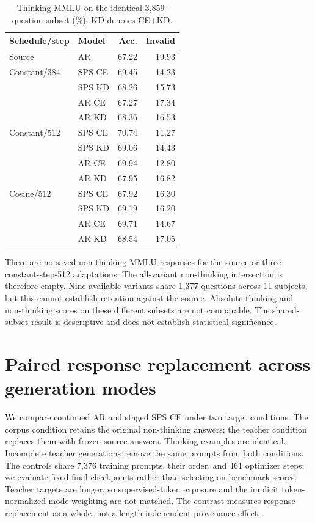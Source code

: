\begin{table}[h]
\centering\small
\begin{tabular}{llrr}
\toprule
Schedule/step & Model & Acc. & Invalid\\
\midrule
Source & AR & 67.22 & 19.93\\
Constant/384 & SPS CE & 69.45 & 14.23\\
 & SPS KD & 68.26 & 15.73\\
 & AR CE & 67.27 & 17.34\\
 & AR KD & 68.36 & 16.53\\
Constant/512 & SPS CE & 70.74 & 11.27\\
 & SPS KD & 69.06 & 14.43\\
 & AR CE & 69.94 & 12.80\\
 & AR KD & 67.95 & 16.82\\
Cosine/512 & SPS CE & 67.92 & 16.30\\
 & SPS KD & 69.19 & 16.20\\
 & AR CE & 69.71 & 14.67\\
 & AR KD & 68.54 & 17.05\\
\bottomrule
\end{tabular}
\caption{Thinking MMLU on the identical 3,859-question subset (\%). KD denotes CE+KD.}
\end{table}

There are no saved non-thinking MMLU responses for the source or three constant-step-512 adaptations. The all-variant non-thinking intersection is therefore empty. Nine available variants share 1,377 questions across 11 subjects, but this cannot establish retention against the source. Absolute thinking and non-thinking scores on these different subsets are not comparable. The shared-subset result is descriptive and does not establish statistical significance.

\section{Paired response replacement across generation modes}\label{app:provenance}
We compare continued AR and staged SPS CE under two target conditions. The corpus condition retains the original non-thinking answers; the teacher condition replaces them with frozen-source answers. Thinking examples are identical. Incomplete teacher generations remove the same prompts from both conditions. The controls share 7,376 training prompts, their order, and 461 optimizer steps; we evaluate fixed final checkpoints rather than selecting on benchmark scores. Teacher targets are longer, so supervised-token exposure and the implicit token-normalized mode weighting are not matched. The contrast measures response replacement as a whole, not a length-independent provenance effect.

